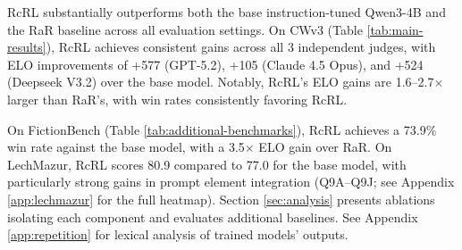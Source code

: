 \documentclass{article}
\theoremstyle{plain}
\theoremstyle{definition}
\theoremstyle{remark}
\begin{document}
RcRL substantially outperforms both the base instruction-tuned Qwen3-4B and the RaR baseline across all evaluation settings. On CWv3 (Table \ref{tab:main-results}),  RcRL achieves consistent gains across all 3 independent judges, with ELO improvements of +577 (GPT-5.2), +105 (Claude 4.5 Opus), and +524 (Deepseek V3.2) over the base model. Notably, RcRL's ELO gains are 1.6–2.7$\times$ larger than RaR's, with win rates consistently favoring RcRL.


\begin{table}[t]
  \caption{\textbf{Additional benchmark results.} FictionBench and the LechMazur Writing benchmark. Best results per model in \textbf{bold}.}
  \begin{center}
    \begin{small}
      \begin{sc}
      \end{sc}
    \end{small}
  \end{center}
\label{tab:additional-benchmarks}
\end{table}

On FictionBench (Table \ref{tab:additional-benchmarks}), RcRL achieves a 73.9\% win rate against the base model, with a 3.5$\times$ ELO gain over RaR. On LechMazur, RcRL scores 80.9 compared to 77.0 for the base model, with particularly strong gains in prompt element integration (Q9A–Q9J; see Appendix \ref{app:lechmazur} for the full heatmap). Section \ref{sec:analysis} presents ablations isolating each component and evaluates additional baselines. See Appendix \ref{app:repetition} for lexical analysis of trained models' outputs.
\end{document}
